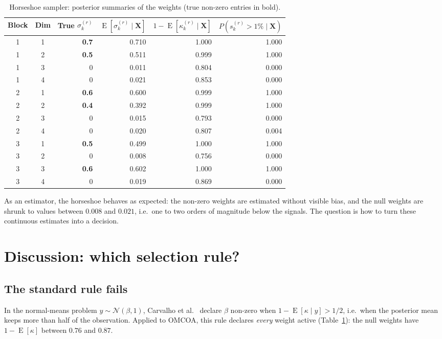 \documentclass[11pt]{article}
\DeclareMathOperator{\E}{E}
\newcommand{\X}{\mathbf{X}}
\begin{document}
\begin{table}[ht]
\centering
\caption{Horseshoe sampler: posterior summaries of the weights (true non-zero entries in bold).}\label{tab:hs}
\begin{tabular}{ccrrrr}
\toprule
Block & Dim & True $\sigma_k^{(r)}$ & $\E[\sigma_k^{(r)}\mid\X]$ & $1-\E[\kappa_k^{(r)}\mid\X]$ & $P(s_k^{(r)}>1\%\mid\X)$ \\
\midrule
1 & 1 & \textbf{0.7} & 0.710 & 1.000 & 1.000 \\
1 & 2 & \textbf{0.5} & 0.511 & 0.999 & 1.000 \\
1 & 3 & 0   & 0.011 & 0.804 & 0.000 \\
1 & 4 & 0   & 0.021 & 0.853 & 0.000 \\
2 & 1 & \textbf{0.6} & 0.600 & 0.999 & 1.000 \\
2 & 2 & \textbf{0.4} & 0.392 & 0.999 & 1.000 \\
2 & 3 & 0   & 0.015 & 0.793 & 0.000 \\
2 & 4 & 0   & 0.020 & 0.807 & 0.004 \\
3 & 1 & \textbf{0.5} & 0.499 & 1.000 & 1.000 \\
3 & 2 & 0   & 0.008 & 0.756 & 0.000 \\
3 & 3 & \textbf{0.6} & 0.602 & 1.000 & 1.000 \\
3 & 4 & 0   & 0.019 & 0.869 & 0.000 \\
\bottomrule
\end{tabular}
\end{table}

As an estimator, the horseshoe behaves as expected: the non-zero weights are estimated without visible bias, and
the null weights are shrunk to values between $0.008$ and $0.021$, i.e.\ one to two orders of magnitude below the
signals. The question is how to turn these continuous estimates into a decision.

\section{Discussion: which selection rule?}\label{sec:rules}

\subsection{The standard rule fails}

In the normal-means problem $y\sim\mathcal N(\beta,1)$, Carvalho et al.\ \cite{carvalho2010} declare $\beta$ non-zero when
$1-\E[\kappa\mid y]>1/2$, i.e.\ when the posterior mean keeps more than half of the observation. Applied to OMCOA,
this rule declares \emph{every} weight active (Table~\ref{tab:hs}): the null weights have $1-\E[\kappa]$ between $0.76$
and $0.87$.
\end{document}
